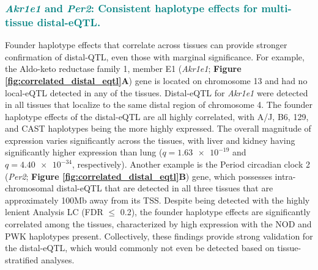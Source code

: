 \documentclass[9pt,twocolumn,twoside]{gsajnl}
\newcommand{\GKinline}[1]{\textcolor{teal}{#1}}
\begin{document}
\subsubsection{\GKinline{\textit{Akr1e1} and \textit{Per2}: Consistent haplotype effects for multi-tissue distal-eQTL.}}
Founder haplotype effects that correlate across tissues can provide stronger confirmation of distal-QTL, even those with marginal significance. 
For example, the Aldo-keto reductase family 1, member E1 (\textit{Akr1e1}; \textbf{Figure \ref{fig:correlated_distal_eqtl}A}) gene is located on chromosome 13 and had no local-eQTL detected in any of the tissues. Distal-eQTL for \textit{Akr1e1} were detected in all tissues that localize to the same distal region of chromosome 4. The founder haplotype effects of the distal-eQTL are all highly correlated, with A/J, B6, 129, and CAST haplotypes being the more highly expressed. The overall magnitude of expression varies significantly across the tissues, with liver and kidney having significantly higher expression than lung ($q = \num{1.63e-19}$ and $q = \num{4.40e-34}$, respectively).
Another example is the Period circadian clock 2 (\textit{Per2}; \textbf{Figure \ref{fig:correlated_distal_eqtl}B}) gene, which possesses intra-chromosomal distal-eQTL that are detected in all three tissues that are approximately 100Mb away from its TSS. Despite being detected with the highly lenient Analysis LC (FDR $\leq$ 0.2), the founder haplotype effects are significantly correlated among the tissues, characterized by high expression with the NOD and PWK haplotypes present. Collectively, these findings provide strong validation for the distal-eQTL, which would commonly not even be detected based on tissue-stratified analyses.
\end{document}
